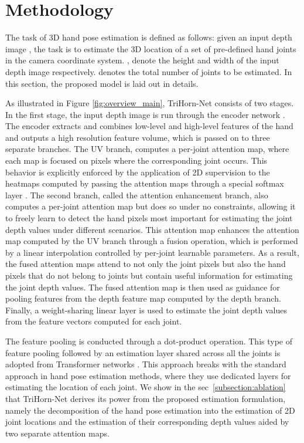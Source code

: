 \documentclass{article}
\begin{document}
\section{Methodology}
The task of 3D hand pose estimation is defined as follows: given an input depth image , the task is to estimate the 3D location of a set of pre-defined hand joints  in the camera coordinate system. ,  denote the height and width of the input depth image respectively.  denotes the total number of joints to be estimated. In this section, the proposed model is laid out in details.
\par
As illustrated in Figure \ref{fig:overview_main}, TriHorn-Net consists of two stages. In the first stage, the input depth image is run through the encoder network . The encoder extracts and combines low-level and high-level features of the hand and outputs a high resolution feature volume, which is passed on to three separate branches. The UV branch, computes a per-joint attention map, where each map is focused on pixels where the corresponding joint occurs. This behavior is explicitly enforced by the application of 2D supervision to the heatmaps computed by passing the attention maps through a special softmax layer \cite{iqbal2018hand}. The second branch, called the attention enhancement branch, also computes a per-joint attention map but does so under no constraints, allowing it to freely learn to detect the hand pixels most important for estimating the joint depth values under different scenarios. This attention map enhances the attention map computed by the UV branch through a fusion operation, which is performed by a linear interpolation controlled by per-joint learnable parameters. As a result, the fused attention maps attend to not only the joint pixels but also the hand pixels that do not belong to joints but contain useful information for estimating the joint depth values. The fused attention map is then used as guidance for pooling features from the depth feature map computed by the depth branch. Finally, a weight-sharing linear layer is used to estimate the joint depth values from the feature vectors computed for each joint.
\par
The feature pooling is conducted through a dot-product operation. This type of feature pooling followed by an estimation layer shared across all the joints is adopted from Transformer networks \cite{vaswani2017attention}. This approach breaks with the standard approach in hand pose estimation methods, where they use dedicated layers for estimating the location of each joint. We show in the sec~\ref{subsection:ablation} that TriHorn-Net derives its power from the proposed estimation formulation, namely the decomposition of the hand pose estimation into the estimation of 2D joint locations and the estimation of their corresponding depth values aided by two separate attention maps.
\end{document}
